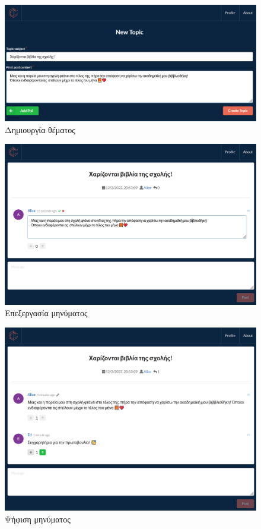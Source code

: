 \vspace{2\baselineskip}

\begin{figure}[H]
	\centering
	\includegraphics[width=\textwidth]{assets/figures/appendix-a/screenshot-3-topic-creation}
	\caption{Δημιουργία θέματος}
\end{figure}

\begin{figure}[H]
	\centering
	\includegraphics[width=.9\textwidth]{assets/figures/appendix-a/screenshot-4-post-editing}
	\caption{Επεξεργασία μηνύματος}
\end{figure}

\begin{figure}[H]
	\centering
	\includegraphics[width=.9\textwidth]{assets/figures/appendix-a/screenshot-5-post-voting}
	\caption{Ψήφιση μηνύματος}
\end{figure}

